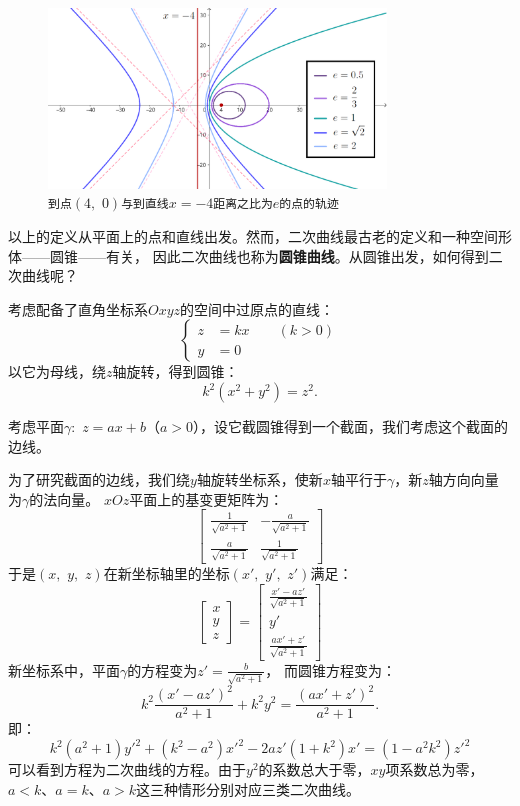 \documentclass[12pt,UTF8]{ctexbook}
\begin{document}
\begin{figure}[h] 
    \centering
    \includegraphics[width=0.8\textwidth]{tu/二次曲线第二定义1.png}
    \caption*{\texttt{到点}$(4,\,\,0)$\texttt{与到直线}$x=-4$\texttt{距离之比为}$e$\texttt{的点的轨迹}}
\end{figure}
以上的定义从平面上的点和直线出发。然而，二次曲线最古老的定义和一种空间形体——圆锥——有关，
因此二次曲线也称为\textbf{圆锥曲线}。从圆锥出发，如何得到二次曲线呢？

考虑配备了直角坐标系$Oxyz$的空间中过原点的直线：
$$ 
\left\{
    \begin{array}{cl}
        z &= kx \qquad (k > 0) \\
        y &= 0
    \end{array}
\right.
$$
以它为母线，绕$z$轴旋转，得到圆锥：
$$ k^2(x^2 + y^2) = z^2. $$

考虑平面$\gamma: \,\,z = ax + b$（$a > 0$），设它截圆锥得到一个截面，我们考虑这个截面的边线。

为了研究截面的边线，我们绕$y$轴旋转坐标系，使新$x$轴平行于$\gamma$，新$z$轴方向向量为$\gamma$的法向量。
$xOz$平面上的基变更矩阵为：
$$
\begin{bmatrix}
    \frac{1}{\sqrt{a^2+1}} & -\frac{a}{\sqrt{a^2+1}} \\
    \frac{a}{\sqrt{a^2+1}} & \frac{1}{\sqrt{a^2+1}}
\end{bmatrix}
$$
于是$(x,\,\,y,\,\,z)$在新坐标轴里的坐标$(x',\,\,y',\,\,z')$满足：
$$
\begin{bmatrix}
    x \\ y \\ z
\end{bmatrix}
= 
\begin{bmatrix}
    \frac{x' - az'}{\sqrt{a^2+1}} \\ y' \\ \frac{ax' + z'}{\sqrt{a^2+1}}
\end{bmatrix}
$$
新坐标系中，平面$\gamma$的方程变为$z'=\frac{b}{\sqrt{a^2+1}}$，
而圆锥方程变为：
$$ k^2\frac{(x' - az')^2}{a^2+1} + k^2y^2 = \frac{(ax' + z')^2}{a^2+1} . $$
即：
$$ k^2(a^2+1)y'^2 + (k^2 - a^2)x'^2 - 2az'(1 + k^2)x' = (1 - a^2k^2)z'^2 $$
可以看到方程为二次曲线的方程。由于$y^2$的系数总大于零，$xy$项系数总为零，
$a<k$、$a=k$、$a>k$这三种情形分别对应三类二次曲线。
\end{document}
